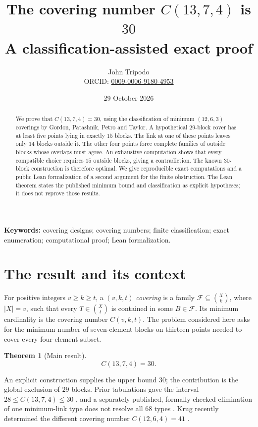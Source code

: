 \documentclass[11pt]{article}
\title{\vspace{-1.3em}\bfseries The covering number $C(13,7,4)$ is $30$\\[0.32em]
\large\normalfont A classification-assisted exact proof}
\author{John Tripodo\\\small ORCID: \href{https://orcid.org/0009-0006-9180-4953}{0009-0006-9180-4953}}
\date{29 October 2026}
\newcommand{\bin}[2]{\binom{#1}{#2}}
\newcommand{\coverfam}{\mathcal F}
\newtheorem{theorem}{Theorem}[section]
\theoremstyle{definition}
\theoremstyle{remark}
\begin{document}
\maketitle
\vspace{-1.3em}
\begin{abstract}\noindent
We prove that $C(13,7,4)=30$, using the classification of minimum
$(12,6,3)$ coverings by Gordon, Patashnik, Petro and Taylor.
A hypothetical $29$-block cover has at least five points lying in exactly
$15$ blocks. The link at one of these points leaves only $14$ blocks
outside it. The other four points force complete families of outside
blocks whose overlaps must agree. An exhaustive computation shows that
every compatible choice requires $15$ outside blocks, giving a
contradiction. The known $30$-block construction is therefore optimal.
We give reproducible exact computations and a public Lean formalization
of a second argument for the finite obstruction. The Lean theorem
states the published minimum bound and classification as explicit
hypotheses; it does not reprove those results.
\end{abstract}
\noindent\textbf{Keywords:} covering designs; covering numbers; finite classification;
exact enumeration; computational proof; Lean formalization.
\medskip

\section{The result and its context}
For positive integers $v\geq k\geq t$, a $(v,k,t)$ \emph{covering} is a
family $\coverfam\subseteq\bin{X}{k}$, where $|X|=v$, such that every
$T\in\bin{X}{t}$ is contained in some $B\in\coverfam$. Its minimum cardinality
is the covering number $C(v,k,t)$. The problem considered here asks for the
minimum number of seven-element blocks on thirteen points needed to cover
every four-element subset.

\begin{theorem}[Main result]\label{thm:main}
\[
\boxed{C(13,7,4)=30.}
\]
\end{theorem}

An explicit construction supplies the upper bound $30$; the contribution
is the global exclusion of $29$ blocks. Prior tabulations gave the interval
$28\leq C(13,7,4)\leq30$ \cite{LJCR}, and a separately published,
formally checked elimination of one minimum-link type does not resolve
all $68$ types \cite{Dwares}. Krug recently determined the different covering number
$C(12,6,4)=41$ \cite{Krug}.
\end{document}
